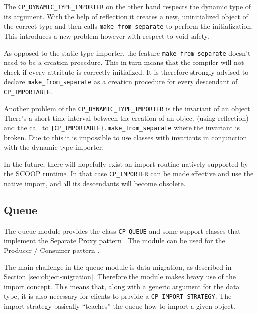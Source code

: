 The \lstinline!CP_DYNAMIC_TYPE_IMPORTER! on the other hand respects the dynamic type of its argument.
With the help of reflection it creates a new, uninitialized object of the correct type and then calls \lstinline!make_from_separate! to perform the initialization.
This introduces a new problem however with respect to void safety.

As opposed to the static type importer, the feature \lstinline!make_from_separate! doesn't need to be a creation procedure.
This in turn means that the compiler will not check if every attribute is correctly initialized.
It is therefore strongly advised to declare \lstinline!make_from_separate! as a creation procedure for every descendant of \lstinline!CP_IMPORTABLE!.

Another problem of the \lstinline!CP_DYNAMIC_TYPE_IMPORTER! is the invariant of an object.
There's a short time interval between the creation of an object (using reflection) and the call to \lstinline!{CP_IMPORTABLE}.make_from_separate! where the invariant is broken.
Due to this it is impossible to use classes with invariants in conjunction with the dynamic type importer.

In the future, there will hopefully exist an import routine natively supported by the SCOOP runtime.
In that case \lstinline!CP_IMPORTER! can be made effective and use the native import, and all its descendants will become obsolete.

\subsection{Queue}

The queue module provides the class \lstinline!CP_QUEUE! and some support classes that implement the Separate Proxy pattern .
The module can be used for the Producer / Consumer pattern .

The main challenge in the queue module is data migration, as described in Section \ref{sec:object-migration}.
Therefore the module makes heavy use of the import concept.
This means that, along with a generic argument for the data type, it is also necessary for clients to provide a \lstinline!CP_IMPORT_STRATEGY!.
The import strategy basically ``teaches'' the queue how to import a given object.

